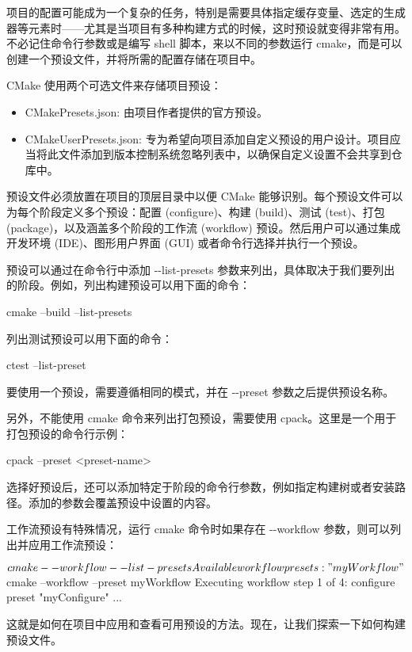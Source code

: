 项目的配置可能成为一个复杂的任务，特别是需要具体指定缓存变量、选定的生成器等元素时——尤其是当项目有多种构建方式的时候，这时预设就变得非常有用。不必记住命令行参数或是编写 shell 脚本，来以不同的参数运行 cmake，而是可以创建一个预设文件，并将所需的配置存储在项目中。

CMake 使用两个可选文件来存储项目预设：

\begin{itemize}
\item
CMakePresets.json: 由项目作者提供的官方预设。

\item
CMakeUserPresets.json: 专为希望向项目添加自定义预设的用户设计。项目应当将此文件添加到版本控制系统忽略列表中，以确保自定义设置不会共享到仓库中。
\end{itemize}

预设文件必须放置在项目的顶层目录中以便 CMake 能够识别。每个预设文件可以为每个阶段定义多个预设：配置 (configure)、构建 (build)、测试 (test)、打包 (package)，以及涵盖多个阶段的工作流 (workflow) 预设。然后用户可以通过集成开发环境 (IDE)、图形用户界面 (GUI) 或者命令行选择并执行一个预设。

预设可以通过在命令行中添加 -{}-list-presets 参数来列出，具体取决于我们要列出的阶段。例如，列出构建预设可以用下面的命令：

\begin{shell}
cmake --build --list-presets
\end{shell}

列出测试预设可以用下面的命令：

\begin{shell}
ctest --list-preset
\end{shell}

要使用一个预设，需要遵循相同的模式，并在 -{}-preset 参数之后提供预设名称。

另外，不能使用 cmake 命令来列出打包预设，需要使用 cpack。这里是一个用于打包预设的命令行示例：

\begin{shell}
cpack --preset <preset-name>
\end{shell}

选择好预设后，还可以添加特定于阶段的命令行参数，例如指定构建树或者安装路径。添加的参数会覆盖预设中设置的内容。

工作流预设有特殊情况，运行 cmake 命令时如果存在 -{}-workflow 参数，则可以列出并应用工作流预设：

\begin{shell}
$ cmake --workflow --list-presets
Available workflow presets:
    "myWorkflow"
$ cmake --workflow --preset myWorkflow
Executing workflow step 1 of 4: configure preset "myConfigure"
...
\end{shell}

这就是如何在项目中应用和查看可用预设的方法。现在，让我们探索一下如何构建预设文件。

























